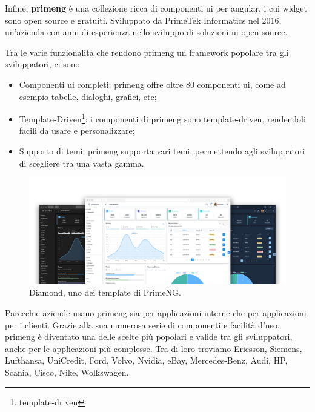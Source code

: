 \newpage %
Infine, \textbf{\acrfull{primeng}} è una collezione ricca di componenti \acrshort{ui} per \gls{angular}, i cui widget sono \gls{open source} e gratuiti. Sviluppato da PrimeTek Informatics nel 2016, un'azienda con anni di esperienza nello sviluppo di soluzioni \acrshort{ui} \gls{open source}.

Tra le varie funzionalità che rendono \acrshort{primeng} un \gls{framework} popolare tra gli sviluppatori, ci sono:
\begin{itemize}
\item Componenti \acrshort{ui} completi: \acrshort{primeng} offre oltre 80 componenti \acrshort{ui}, come ad esempio tabelle, dialoghi, grafici, etc;
\item Template-Driven\footnote{\glsdesc{template-driven}}: i componenti di \acrshort{primeng} sono template-driven, rendendoli facili da usare e personalizzare;
\item Supporto di temi: \acrshort{primeng} supporta vari temi, permettendo agli sviluppatori di scegliere tra una vasta gamma.
\end{itemize}

\begin{figure}[H]
\centering
\includegraphics[width=1\textwidth]{Images/diamond.png}
\caption{\label{fig:diamond}Diamond, uno dei template di PrimeNG.}
\end{figure}

Parecchie aziende usano \acrshort{primeng} sia per applicazioni interne che per applicazioni per i clienti. Grazie alla sua numerosa serie di componenti e facilità d'uso, \acrshort{primeng} è diventato una delle scelte più popolari e valide tra gli sviluppatori, anche per le applicazioni più complesse.\newline
Tra di loro troviamo Ericsson, Siemens, Lufthansa, UniCredit, Ford, Volvo, Nvidia, eBay, Mercedes-Benz, Audi, HP, Scania, Cisco, Nike, Wolkswagen.

